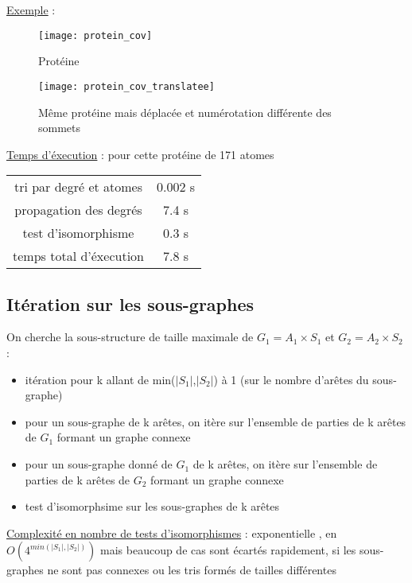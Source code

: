 \documentclass[a4paper, french, twoside]{article}
\begin{document}
\noindent \underline{Exemple} : 
\begin{multicols}{2}
    \begin{figure}[H]
        \centering
        \texttt{[image: protein\_cov]}
        \caption{\label{fig: Protéine}Protéine}
    \end{figure}
    \begin{center}
    \begin{figure}[H]
        \centering
        \texttt{[image: protein\_cov\_translatee]}
        \caption{\label{fig: Proteine translatee}Même protéine mais déplacée et numérotation différente des sommets}
    \end{figure}
\end{center}
\end{multicols}
\underline{Temps d'éxecution} : pour cette protéine de 171 atomes
\begin{center}
\begin{tabular}{c|c}
    tri par degré et atomes & 0.002 s\\
    propagation des degrés & 7.4 s \\
    test d'isomorphisme & 0.3 s \\
    temps total d'éxecution & 7.8 s
\end{tabular}
\end{center}

\subsection{Itération sur les sous-graphes}
\noindent On cherche la sous-structure de taille maximale de $G_1=A_1\times S_1$ et $G_2=A_2\times S_2$ :
\begin{itemize}
    \item itération pour k allant de min($|S_1|$,$|S_2|$) à 1 (sur le nombre d'arêtes du sous-graphe)
    \item pour un sous-graphe de k arêtes, on itère sur l'ensemble de parties de k arêtes de $G_1$ formant un graphe connexe
    \item pour un sous-graphe donné de $G_1$ de k arêtes, on itère sur l'ensemble de parties de k arêtes de $G_2$ formant un graphe connexe
    \item test d'isomorphsime sur les sous-graphes de k arêtes
\end{itemize}
\underline{Complexité en nombre de tests d'isomorphismes} : exponentielle , en $O( 4^{min(|S_1|,|S_2|)})$
mais beaucoup de cas sont écartés rapidement, si les sous-graphes ne sont pas connexes ou les tris formés de tailles différentes \newline
\end{document}

